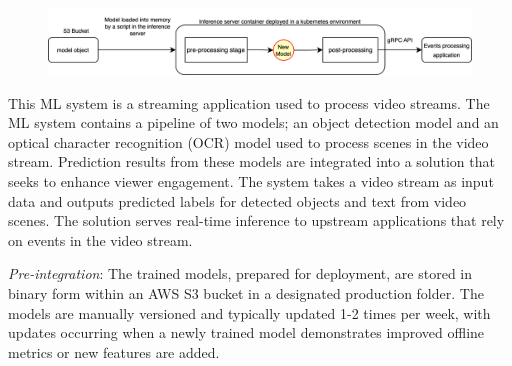 \DIFaddbegin \begin{figure}[b]
\centering
\includegraphics[width=\linewidth]{images/case2_deployment_process.png}
\caption{}
\label{fig: case2_deployment_process}
\end{figure}
\DIFaddend 

\DIFdelbegin %
{%
}
\DIFdelend %

This ML system is a streaming application used to process video streams. The ML system contains a pipeline of two models; an object detection model and an optical character recognition (OCR) model used to process scenes in the video stream. Prediction results from these models are integrated into a solution that seeks to enhance viewer engagement. The system takes a video stream as input data and outputs predicted labels for detected objects and text from video scenes. The solution serves real-time inference to upstream applications that rely on events in the video stream.

\textit{Pre-integration}: The trained models, prepared for deployment, are stored in binary form within an AWS S3 bucket in a designated production folder. The models are manually versioned and typically updated 1-2 times per week, with updates occurring when a newly trained model demonstrates improved offline metrics or new features are added.

